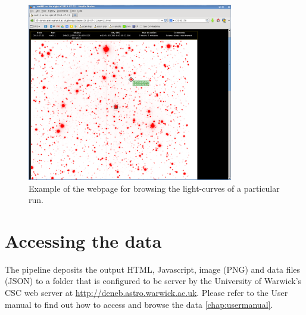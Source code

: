 \begin{figure}[!h]
	\centering
	\includegraphics[width=90mm]{images/website1.png}
	\caption{Example of the webpage for browsing the light-curves of a particular run.}
	\label{browser}
\end{figure}

  
\section{Accessing the data}
The pipeline deposits the output HTML, Javascript, image (PNG) and data files (JSON) to a folder that is configured to be server by the University of Warwick's CSC web server at \url{http://deneb.astro.warwick.ac.uk}. Please refer to the User manual to find out how to access and browse the data \ref{chap:usermanual}. 

